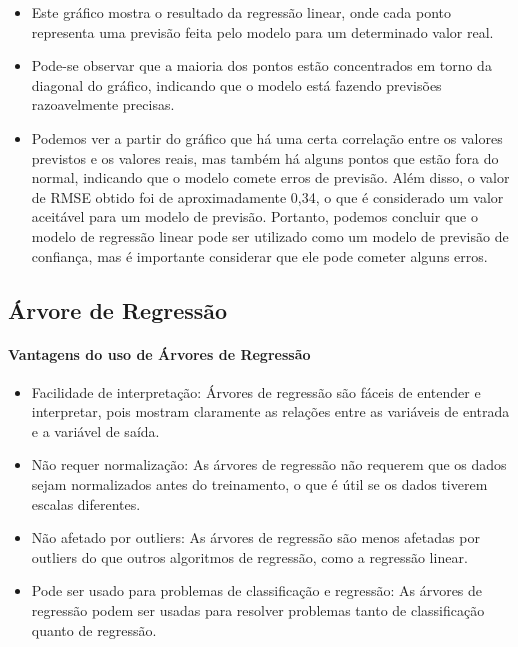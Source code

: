 \documentclass[11pt]{article}
\providecommand{\tightlist}{%
      \setlength{\itemsep}{0pt}\setlength{\parskip}{0pt}}
\begin{document}
    
    \begin{itemize}
\tightlist
\item
  Este gráfico mostra o resultado da regressão linear, onde cada ponto
  representa uma previsão feita pelo modelo para um determinado valor
  real.
\item
  Pode-se observar que a maioria dos pontos estão concentrados em torno
  da diagonal do gráfico, indicando que o modelo está fazendo previsões
  razoavelmente precisas.
\item
  Podemos ver a partir do gráfico que há uma certa correlação entre os
  valores previstos e os valores reais, mas também há alguns pontos que
  estão fora do normal, indicando que o modelo comete erros de previsão.
  Além disso, o valor de RMSE obtido foi de aproximadamente 0,34, o que
  é considerado um valor aceitável para um modelo de previsão. Portanto,
  podemos concluir que o modelo de regressão linear pode ser utilizado
  como um modelo de previsão de confiança, mas é importante considerar
  que ele pode cometer alguns erros.
\end{itemize}

    \hypertarget{uxe1rvore-de-regressuxe3o}{%
\subsection{Árvore de Regressão}\label{uxe1rvore-de-regressuxe3o}}

    \hypertarget{vantagens-do-uso-de-uxe1rvores-de-regressuxe3o}{%
\paragraph{Vantagens do uso de Árvores de
Regressão}\label{vantagens-do-uso-de-uxe1rvores-de-regressuxe3o}}

    \begin{itemize}
\tightlist
\item
  Facilidade de interpretação: Árvores de regressão são fáceis de
  entender e interpretar, pois mostram claramente as relações entre as
  variáveis de entrada e a variável de saída.
\item
  Não requer normalização: As árvores de regressão não requerem que os
  dados sejam normalizados antes do treinamento, o que é útil se os
  dados tiverem escalas diferentes.
\item
  Não afetado por outliers: As árvores de regressão são menos afetadas
  por outliers do que outros algoritmos de regressão, como a regressão
  linear.
\item
  Pode ser usado para problemas de classificação e regressão: As árvores
  de regressão podem ser usadas para resolver problemas tanto de
  classificação quanto de regressão.
\end{itemize}
\end{document}
